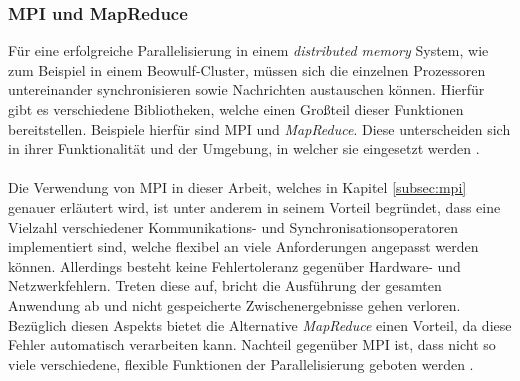 \subsubsection{MPI und MapReduce}
\label{subsubsec:mpi_and_mapreduce}
Für eine erfolgreiche Parallelisierung in einem \emph{distributed memory} System, wie zum Beispiel in einem Beowulf-Cluster, müssen sich die einzelnen Prozessoren untereinander synchronisieren sowie Nachrichten austauschen können. Hierfür gibt es verschiedene Bibliotheken, welche einen Großteil dieser Funktionen bereitstellen. Beispiele hierfür sind \ac{MPI} und \emph{MapReduce}. Diese unterscheiden sich in ihrer Funktionalität und der Umgebung, in welcher sie eingesetzt werden \cite{nielsen2016introduction}.
\\\\
Die Verwendung von \ac{MPI} in dieser Arbeit, welches in Kapitel \ref{subsec:mpi} genauer erläutert wird, ist unter anderem in seinem Vorteil begründet, dass eine Vielzahl verschiedener Kommunikations- und Synchronisationsoperatoren implementiert sind, welche flexibel an viele Anforderungen angepasst werden können. Allerdings besteht keine Fehlertoleranz gegenüber Hardware- und Netzwerkfehlern. Treten diese auf, bricht die Ausführung der gesamten Anwendung ab und nicht gespeicherte Zwischenergebnisse gehen verloren. Bezüglich diesen Aspekts bietet die Alternative \emph{MapReduce} einen Vorteil, da diese Fehler automatisch verarbeiten kann. Nachteil gegenüber \ac{MPI} ist, dass nicht so viele verschiedene, flexible Funktionen der Parallelisierung geboten werden \cite{nielsen2016introduction}.

